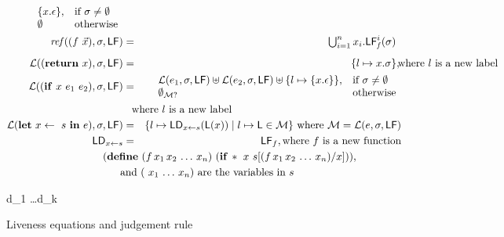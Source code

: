 \documentclass[9pt]{sigplanconf}
\def\myvec{\mathaccent"017E } %
\begin{document}
\begin{figure*}[t]
\begin{eqnarray*}
\begin{array}{l l}
                    \{x.\epsilon\},  & \mbox{if}~\sigma \ne \emptyset\\
                    \emptyset  & \mbox{otherwise}
                 \end{array} \\
\mathit{ref\/}((f~\myvec{x}),\sigma,\Lfonly)
          &=&  \begin{array}{@{}l}  %
               \bigcup_{i=1}^n x_i.\Lf{f}{i}{\sigma}
               \end{array}
\\[1ex]
\mathcal{L}((\RETURN~x),\sigma,\Lfonly) &=& \{l \mapsto x.\sigma\}, \makebox[0mm]{\hspace*{3cm} where $l$ is a new label} \\
\mathcal{L}((\SIF~x~e_1~e_2),\sigma,\Lfonly) &=&
        \begin{array}{l l}
                    \mathcal{L}(e_1,\sigma,\Lfonly) \uplus
        \mathcal{L}(e_2,\sigma,\Lfonly) \uplus
        \{l \mapsto  \{x.\epsilon\}\},  & \mbox{if}~\sigma \ne \emptyset\\
        \emptyset_{\cal{M}?}  & \mbox{otherwise}
                 \end{array} \\
 \makebox[0mm]{\hspace*{3.8cm} where $l$ is a new label}\\
\mathcal{L}(\LET~x \leftarrow~s~\IN~e),\sigma,\Lfonly) &=&
        \{ l \mapsto \Ldonly_{x \leftarrow s}(\Lv(x)) \mid l \mapsto \Lv
        \in \mathcal{M}\}
\mbox{ where } \mathcal{M} = \mathcal{L}(e,\sigma,\Lfonly)\\
\Ldonly_{x \leftarrow s} &=& \Lfonly_f, \mbox{where}~f~\mbox{is a new function}\\
 \makebox[0mm]{\hspace*{7cm}   
 $(\DEFINE~(f\,x_1\,x_2\, \ldots \, x_n)~(\SIF\,*~x~s[(f\,x_1\,
           x_2\, \ldots\, x_n)/x]))$,} \\
 \makebox[0mm]{\hspace*{5.5cm} and 
     $(\ x_1\, \ldots\, x_n)$ are the variables in $s$}
\end{eqnarray*}
\begin{minipage}{0.85\textwidth}
        { d_1 \ldots d_k \len \Lfonly
\\ }
\end{minipage}
  \caption{Liveness equations and judgement rule}\label{fig:live-judge}
\end{figure*}
\end{document}
